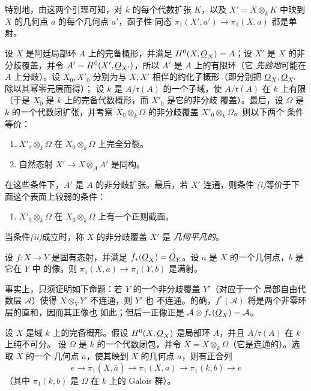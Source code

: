 特别地，由这两个引理可知，对 $k$ 的每个代数扩张 $K$，以及
$X'=X\otimes_k K$ 中映到 $X$ 的几何点 $a$ 的每个几何点 $a'$，函子性
同态 $\pi_1(X',a')\longrightarrow\pi_1(X,a)$ 都是单射。

 设 $X$ 是阿廷局部环 $A$ 上的完备概形，并满足
$H^0(X,\underline{O}_X)=A$；设 $X'$ 是 $X$ 的非分歧覆盖，并令
$A'=H^0(X',\underline{O}_{X'})$，所以 $A'$ 是 $A$ 上的有限环（它
\textit{先验地}可能在 $A$ 上分歧）。设 $X_0,X'_0$ 分别为与 $X,X'$
相伴的约化子概形（即分别把 $\underline{O}_X,\underline{O}_{X'}$ 除以其幂零元层而得）；
设 $k$ 是 $A/\mathfrak r(A)$ 的一个子域，使 $A/\mathfrak r(A)$ 在 $k$
上有限（于是 $X_0$ 是 $k$ 上的完备代数概形，而 $X'_0$ 是它的非分歧
覆盖）。最后，设 $\Omega$ 是 $k$ 的一个代数闭扩张，并考察
$X_0\otimes_k\Omega$ 的非分歧覆盖 $X'_0\otimes_k\Omega$。则以下两个
条件等价：
\begin{enumerate}
  \item[\textit{i.}] $X'_0\otimes_k\Omega$ 在
    $X_0\otimes_k\Omega$ 上完全分裂。
  \item[\textit{ii.}] 自然态射
    $X'\longrightarrow X\otimes_A A'$ 是同构。
\end{enumerate}
在这些条件下，$A'$ 是 $A$ 的非分歧扩张。最后，若 $X'$ 连通，则条件
\textit{(i)}等价于下面这个表面上较弱的条件：
\begin{enumerate}
  \item[\textit{i bis.}] $X'_0\otimes_k\Omega$ 在
    $X_0\otimes_k\Omega$ 上有一个正则截面。
\end{enumerate}
当条件\textit{(ii)}成立时，称 $X$ 的非分歧覆盖 $X'$ 是
\emph{几何平凡的}。

 设 $f:X\longrightarrow Y$ 是固有态射，并满足
$f_*(\underline{O}_X)=\underline{O}_Y$。设 $a$ 是 $X$ 的一个几何点，$b$ 是它在 $Y$ 中
的像。则 $\pi_1(X,a)\longrightarrow\pi_1(Y,b)$ 是满射。

事实上，只须证明如下命题：若 $Y$ 的一个非分歧覆盖 $Y'$（对应于一个
局部自由代数层 $\mathcal A$）使得 $X\otimes_Y Y'$ 不连通，则 $Y'$ 也
不连通。的确，$f^*(\mathcal A)$ 将是两个非零环层的直和，因而其正像也
如此；但后一正像正是
$\mathcal A\otimes f_*(\underline{O}_X)=\mathcal A$。

 设 $X$ 是域 $k$ 上的完备概形。假设
$H^0(X,\underline{O}_X)$ 是局部环 $A$，并且 $A/\mathfrak r(A)$ 在 $k$ 上纯不可分。
设 $\Omega$ 是 $k$ 的一个代数闭包，并令
$\overline X=X\otimes_k\Omega$（它是连通的）。选取 $\overline X$ 的一个
几何点 $\overline a$，使其映到 $X$ 的几何点 $a$，则有正合列
\[
  e\longrightarrow\pi_1(\overline X,\overline a)
  \longrightarrow\pi_1(X,a)
  \longrightarrow\pi_1(k,b)\longrightarrow e
\]
（其中 $\pi_1(k,b)$ 是 $\Omega$ 在 $k$ 上的 Galois 群）。

